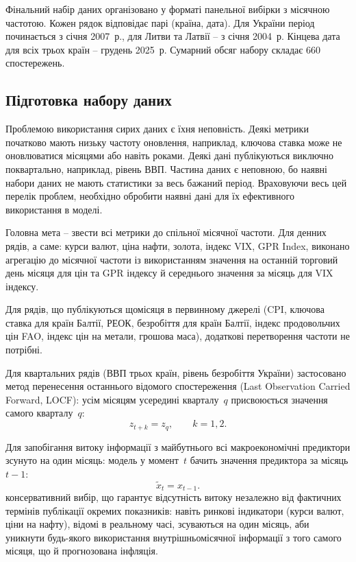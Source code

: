 \documentclass{bachelor_thesis}
\begin{document}
Фінальний набір даних організовано у форматі панельної вибірки з місячною частотою. Кожен рядок відповідає парі (країна, дата). Для України період починається з січня 2007~р., для Литви та Латвії -- з січня 2004~р. Кінцева дата для всіх трьох країн -- грудень 2025~р. Сумарний обсяг набору складає 660 спостережень.

\subsection{Підготовка набору даних}

Проблемою використання сирих даних є їхня неповність. Деякі метрики початково мають низьку частоту оновлення, наприклад, ключова ставка може не оновлюватися місяцями або навіть роками. Деякі дані публікуються виключно поквартально, наприклад, рівень ВВП. Частина даних є неповною, бо наявні набори даних не мають статистики за весь бажаний період. Враховуючи весь цей перелік проблем, необхідно обробити наявні дані для їх ефективного використання в моделі.

Головна мета -- звести всі метрики до спільної місячної частоти.
Для денних рядів, а саме: курси валют, ціна нафти, золота, індекс VIX, GPR Index, виконано агрегацію до місячної частоти із використанням значення на останній торговий день місяця для цін та GPR індексу й середнього значення за місяць для VIX індексу.

Для рядів, що публікуються щомісяця в первинному джерелі (CPI, ключова ставка для країн Балтії, РЕОК, безробіття для країн Балтії, індекс продовольчих цін FAO, індекс цін на метали, грошова маса), додаткові перетворення частоти не потрібні.

Для квартальних рядів (ВВП трьох країн, рівень безробіття України) застосовано метод перенесення останнього відомого спостереження (Last Observation Carried Forward, LOCF): усім місяцям усередині кварталу~$q$ присвоюється значення самого кварталу~$q$:
\begin{equation*}
z_{t+k} = z_q, \qquad k = 1, 2.
\end{equation*}

Для запобігання витоку інформації з майбутнього всі макроекономічні предиктори зсунуто на один місяць: модель у момент~$t$ бачить значення предиктора за місяць $t-1$:
\begin{equation*}
\tilde{x}_t = x_{t-1}.
\end{equation*}
 консервативний вибір, що гарантує відсутність витоку незалежно від фактичних термінів публікації окремих показників: навіть ринкові індикатори (курси валют, ціни на нафту), відомі в реальному часі, зсуваються на один місяць, аби уникнути будь-якого використання внутрішньомісячної інформації з того самого місяця, що й прогнозована інфляція.
\end{document}
